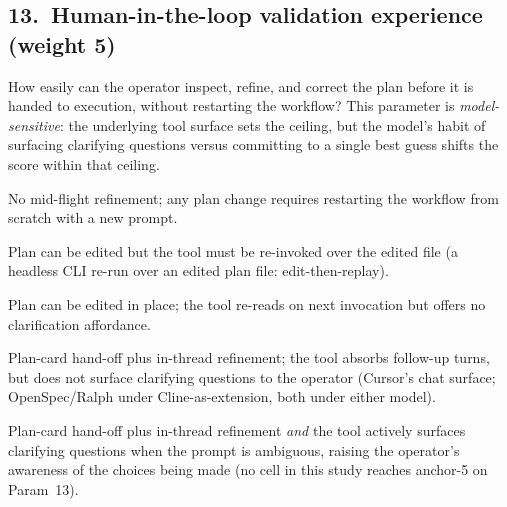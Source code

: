 \subsection*{13.\ Human-in-the-loop validation experience (weight 5)}
How easily can the operator inspect, refine, and correct the plan
before it is handed to execution, without restarting the workflow?
This parameter is \emph{model-sensitive}: the underlying tool surface
sets the ceiling, but the model's habit of surfacing clarifying
questions versus committing to a single best guess shifts the score
within that ceiling.
\begin{description}[leftmargin=11mm, labelindent=0mm]
\item[1] No mid-flight refinement; any plan change requires restarting
the workflow from scratch with a new prompt.
\item[2] Plan can be edited but the tool must be re-invoked over the
edited file (a headless CLI re-run over an edited plan file:
edit-then-replay).
\item[3] Plan can be edited in place; the tool re-reads on next
invocation but offers no clarification affordance.
\item[4] Plan-card hand-off plus in-thread refinement; the tool
absorbs follow-up turns, but does not surface clarifying questions
to the operator (Cursor's chat surface; OpenSpec/Ralph under
Cline-as-extension, both under either model).
\item[5] Plan-card hand-off plus in-thread refinement \emph{and} the
tool actively surfaces clarifying questions when the prompt is
ambiguous, raising the operator's awareness of the choices being
made (no cell in this study reaches anchor-5 on Param~13).
\end{description}

